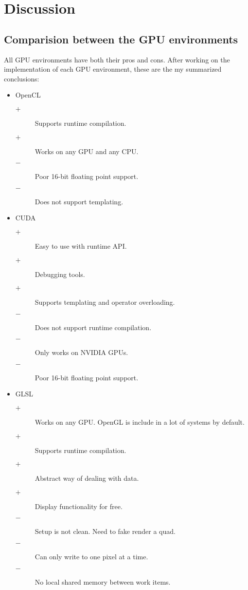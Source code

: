 \section{Discussion}
\subsection{Comparision between the GPU environments}

All GPU environments have both their pros and cons. After working on the implementation of each GPU environment, these are the my summarized conclusions:

\begin{itemize}
\item OpenCL
\begin{description}
  \item[$+$] Supports runtime compilation.
  \item[$+$] Works on any GPU and any CPU.
  \item[$-$] Poor 16-bit floating point support.
  \item[$-$] Does not support templating.
\end{description}
\item CUDA
\begin{description}
  \item[$+$] Easy to use with runtime API.
  \item[$+$] Debugging tools.
  \item[$+$] Supports templating and operator overloading.
  \item[$-$] Does not support runtime compilation.
  \item[$-$] Only works on NVIDIA GPUs.
  \item[$-$] Poor 16-bit floating point support.
\end{description}
\item GLSL
\begin{description}
  \item[$+$] Works on any GPU. OpenGL is include in a lot of systems by default.
  \item[$+$] Supports runtime compilation.
  \item[$+$] Abstract way of dealing with data.
  \item[$+$] Display functionality for free.
  \item[$-$] Setup is not clean. Need to fake render a quad.
  \item[$-$] Can only write to one pixel at a time.
  \item[$-$] No local shared memory between work items.
\end{description}
\end{itemize}

